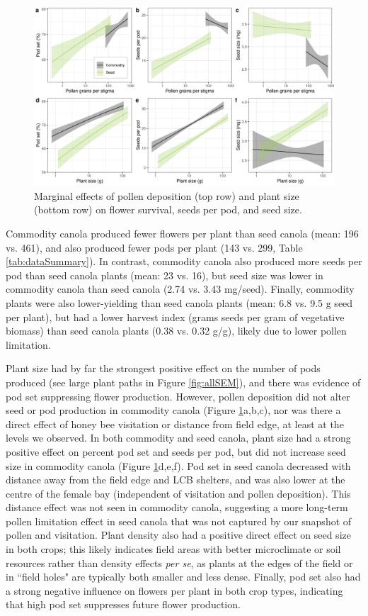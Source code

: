 \documentclass[12pt]{article} %
\begin{document}
\begin{figure}
    \centering
    \includegraphics[width=\textwidth,keepaspectratio=true]{../Figures/allSeeds.png}
    \caption{Marginal effects of pollen deposition (top row) and plant size (bottom row) on flower survival, seeds per pod, and seed size.}
    \label{fig:allSeeds}
\end{figure}

Commodity canola produced fewer flowers per plant than seed canola (mean: 196 vs. 461), and also produced fewer pods per plant (143 vs. 299, Table \ref{tab:dataSummary}).
In contrast, commodity canola also produced more seeds per pod than seed canola plants (mean: 23 vs. 16), but seed size was lower in commodity canola than seed canola (2.74 vs. 3.43 mg/seed). 
Finally, commodity plants were also lower-yielding than seed canola plants (mean: 6.8 vs. 9.5 g seed per plant), but had a lower harvest index (grams seeds per gram of vegetative biomass) than seed canola plants (0.38 vs. 0.32 g/g), likely due to lower pollen limitation.

Plant size had by far the strongest positive effect on the number of pods produced (see large plant paths in Figure \ref{fig:allSEM}), and there was evidence of pod set suppressing flower production.
However, pollen deposition did not alter seed or pod production in commodity canola (Figure \ref{fig:allSeeds}a,b,c), nor was there a direct effect of honey bee visitation or distance from field edge, at least at the levels we observed.
In both commodity and seed canola, plant size had a strong positive effect on percent pod set and seeds per pod, but did not increase seed size in commodity canola (Figure \ref{fig:allSeeds}d,e,f).
Pod set in seed canola decreased with distance away from the field edge and LCB shelters, and was also lower at the centre of the female bay (independent of visitation and pollen deposition).
This distance effect was not seen in commodity canola, suggesting a more long-term pollen limitation effect in seed canola that was not captured by our snapshot of pollen and visitation.
Plant density also had a positive direct effect on seed size in both crops; this likely indicates field areas with better microclimate or soil resources rather than density effects \emph{per se}, as plants at the edges of the field or in ``field holes" are typically both smaller and less dense.
Finally, pod set also had a strong negative influence on flowers per plant in both crop types, indicating that high pod set suppresses future flower production.
\end{document}

